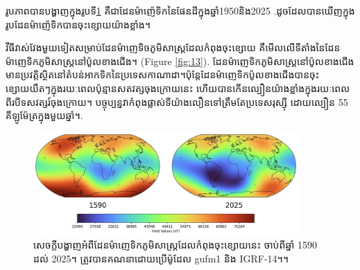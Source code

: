 \documentclass[10pt,twocolumn,letterpaper]{article}
\begin{document}
រូបភាពបានបង្ហាញក្នុងរូបទី\ref{fig:14} គឺជាដែនម៉ាញ៉េទិកនៃផែនដីក្នុងឆ្នាំ​1950​និង​2025 \cite{125,126}.ដូចដែលបានឃើញក្នុងរូបដែនម៉ាញ៉េទិកបានចុះខ្សោយយ៉ាងខ្លាំង។ 

វីធីវាស់វែងមួយទៀតសម្រាប់ដែនម៉ាញេទិចភូមិសាស្ត្រដែលកំពុងចុះខ្សោយ គឺមើលលើទីតាំងនៃដែនម៉ាញេទិកភូមិសាស្ត្រនៅប៉ូលខាងជើង។ (Figure \ref{fig:13}). ដែនម៉ាញេទិកភូមិសាស្ត្រនៅប៉ូលខាងជើងមានប្រវត្តិស្ថិតនៅតំបន់អាកទិកនៃប្រទេសកាណាដា។ប៉ុន្តែដែនម៉ាញេទិកប៉ូលខាងជើងបានចុះខ្សោយយឺតៗក្នុងរយៈពេលប៉ុន្មានសតវត្សចុងក្រោយនេះ ហើយបានកើនល្បឿនយ៉ាងខ្លាំងក្នុងរយៈពេលពីរបីទសវត្សរ៍ចុងក្រោយ។ បច្ចុប្បន្នវាកំពុងផ្លាស់ទីយ៉ាងលឿនទៅត្រឹមតែប្រទេសរុស្ស៊ី ដោយល្បឿន 55 គីឡូម៉ែត្រក្នុងមួយឆ្នាំ។\cite{124}.

\begin{figure}[t]
\begin{center}
\includegraphics[width=0.9\textwidth]{saa.jpg}
\end{center}
   \caption{សេចក្ដីបង្ហាញអំពីដែនម៉ាញេទិកភូមិសាស្ត្រដែលកំពុងចុះខ្សោយនេះ ចាប់ពីឆ្នាំ 1590 ដល់ 2025។ ត្រូវបានគណនាដោយប្រើម៉ូដែល gufm1 និង IGRF-14។\cite{125,126}។}
\label{fig:14}
\end{figure}
\end{document}
